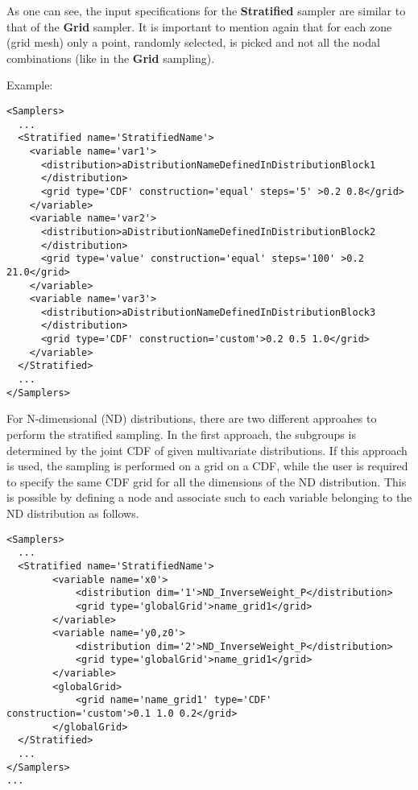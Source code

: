 As one can see, the input specifications for the \textbf{Stratified} sampler are
similar to that of the \textbf{Grid} sampler.
%
It is important to mention again that for each zone (grid mesh) only a point,
randomly selected, is picked and not all the nodal combinations (like in the
\textbf{Grid} sampling).


Example:
\begin{lstlisting}[style=XML,morekeywords={construction,steps,lowerBound,upperBound}]
<Samplers>
  ...
  <Stratified name='StratifiedName'>
    <variable name='var1'>
      <distribution>aDistributionNameDefinedInDistributionBlock1
      </distribution>
      <grid type='CDF' construction='equal' steps='5' >0.2 0.8</grid>
    </variable>
    <variable name='var2'>
      <distribution>aDistributionNameDefinedInDistributionBlock2
      </distribution>
      <grid type='value' construction='equal' steps='100' >0.2 21.0</grid>
    </variable>
    <variable name='var3'>
      <distribution>aDistributionNameDefinedInDistributionBlock3
      </distribution>
      <grid type='CDF' construction='custom'>0.2 0.5 1.0</grid>
    </variable>
  </Stratified>
  ...
</Samplers>
\end{lstlisting}

For N-dimensional  (ND) distributions, there are two different approahes to perform the stratified sampling. In the first approach,
the subgroups is determined by the joint CDF of given multivariate distributions. If this approach is used, the sampling is performed
on a grid on a CDF, while the user is required to specify the same CDF grid for all the dimensions of the ND distribution.
This is possible by defining a  node and associate such  to each variable belonging to the
ND distribution as follows.

\begin{lstlisting}[style=XML,morekeywords={ND,grid}]
<Samplers>
  ...
  <Stratified name='StratifiedName'>
        <variable name='x0'>
            <distribution dim='1'>ND_InverseWeight_P</distribution>
            <grid type='globalGrid'>name_grid1</grid>
        </variable>
        <variable name='y0,z0'>
            <distribution dim='2'>ND_InverseWeight_P</distribution>
            <grid type='globalGrid'>name_grid1</grid>
        </variable>
        <globalGrid>
            <grid name='name_grid1' type='CDF' construction='custom'>0.1 1.0 0.2</grid>
        </globalGrid>
  </Stratified>
  ...
</Samplers>
...
\end{lstlisting}

